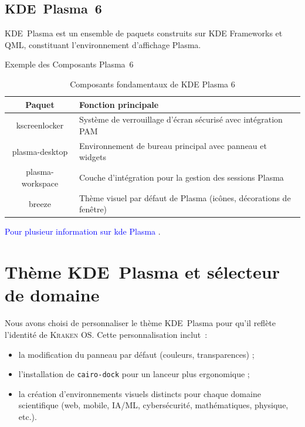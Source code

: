 \subsection{KDE Plasma 6}
\label{sssec:plasma6}

KDE Plasma est un ensemble de paquets construits sur KDE Frameworks et QML, constituant l’environnement d’affichage Plasma.

Exemple des Composants Plasma 6


\begin{table}[H]
    \centering
    \begin{tabular}{|c|p{8cm}|}
        \hline
        \textbf{Paquet}  & \textbf{Fonction principale} \\
        \hline
        kscreenlocker  & Système de verrouillage d'écran sécurisé avec intégration PAM \\
        \hline
        plasma-desktop  & Environnement de bureau principal avec panneau et widgets \\
        \hline
        plasma-workspace  & Couche d'intégration pour la gestion des sessions Plasma \\
        \hline
        breeze  & Thème visuel par défaut de Plasma (icônes, décorations de fenêtre) \\
        \hline
    \end{tabular}
    \caption{Composants fondamentaux de KDE Plasma 6}
    \label{tab:plasma6}
\end{table}

\textcolor{blue}{Pour plusieur information sur kde Plasma   \cite{environnement_plasma}}.\\
\section{Thème KDE Plasma et sélecteur de domaine}
\label{sssec:kde-theme-domain}

Nous avons choisi de personnaliser le thème KDE Plasma pour qu’il reflète l’identité de \textsc{Kraken OS}.  
Cette personnalisation inclut :
\begin{itemize}
  \item la modification du panneau par défaut (couleurs, transparences) ;
  \item l’installation de \texttt{cairo‑dock} pour un lanceur plus ergonomique ;
  \item la création d’environnements visuels distincts pour chaque domaine scientifique (web, mobile, IA/ML, cybersécurité, mathématiques, physique, etc.).
\end{itemize}

